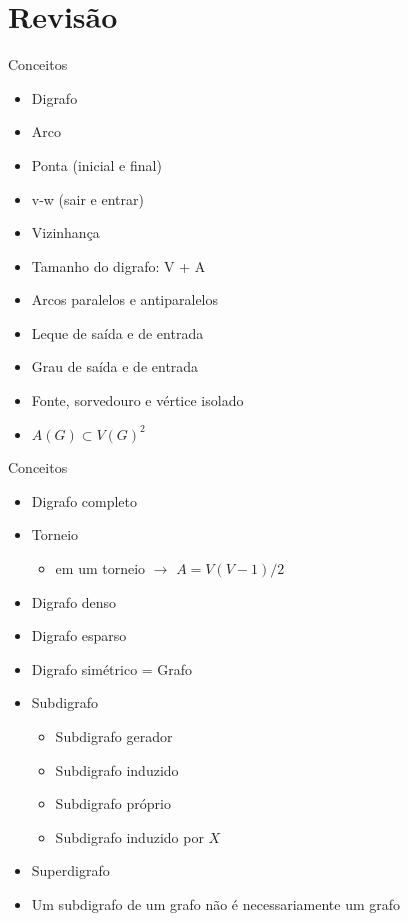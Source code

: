 \documentclass[xcolor=dvipsnames,table]{beamer}
\begin{document}
    \section{Revisão}
	\begin{frame}{Conceitos}
		\begin{itemize}
			\item Digrafo \pause
			\item Arco \pause 
			\item Ponta (inicial e final)	\pause
			\item v-w (sair e entrar) \pause
			\item Vizinhança \pause
			\item Tamanho do digrafo: \pause V + A \pause
			\item Arcos paralelos e antiparalelos \pause
			\item Leque de saída e de entrada \pause
			\item Grau de saída e de entrada \pause
			\item Fonte, sorvedouro e vértice isolado \pause
			\item $A(G) \subset V(G)^2$ 
		\end{itemize}
	\end{frame}
	\begin{frame}{Conceitos}
		\begin{itemize}
			\item Digrafo completo \pause
			\item Torneio \pause
				\begin{itemize}
					\item em um torneio $\rightarrow$ $A = V(V-1)/2$ \pause
				\end{itemize}
			\item Digrafo denso \pause
			\item Digrafo esparso \pause
			\item Digrafo simétrico \pause = Grafo \pause
			\item Subdigrafo \pause
				\begin{itemize}
					\item Subdigrafo gerador \pause
					\item Subdigrafo induzido \pause
					\item Subdigrafo próprio \pause
					\item Subdigrafo induzido por $X$ \pause
				\end{itemize}
			\item Superdigrafo \pause
			\item Um subdigrafo de um grafo não é necessariamente um grafo
		\end{itemize}
	\end{frame}
	
\end{document}
